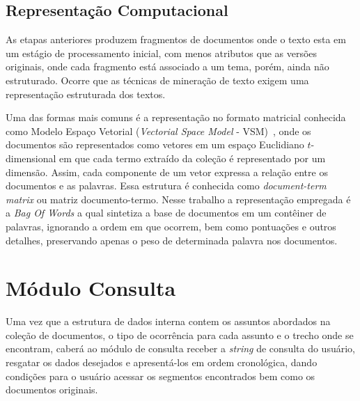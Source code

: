 





\subsection{Representação Computacional}

As etapas anteriores produzem fragmentos de documentos onde o texto esta em um estágio de processamento inicial, com menos atributos que as versões originais, onde cada fragmento está associado a um tema, porém, ainda não estruturado. Ocorre que as técnicas de mineração de texto exigem uma representação estruturada dos textos. %

Uma das formas mais comuns é a representação no formato matricial conhecida como Modelo Espaço Vetorial (\textit{Vectorial Space Model} - VSM)~\cite{Rezende2003}, onde os documentos são representados como vetores em um espaço Euclidiano $t$-dimensional em que cada termo extraído da coleção é representado por um dimensão. Assim, cada componente de um vetor expressa a relação entre os documentos e as palavras. Essa estrutura é conhecida como \textit{document-term matrix} ou matriz documento-termo.  Nesse trabalho a representação empregada é a \textit{Bag Of Words} a qual sintetiza a base de documentos em um contêiner de palavras, ignorando a ordem em que ocorrem, bem como pontuações e outros detalhes, preservando apenas o peso de determinada palavra nos documentos. 







\section{Módulo Consulta}

Uma vez que a estrutura de dados interna contem os assuntos abordados na coleção de documentos, o tipo de ocorrência para cada assunto e o trecho onde se encontram, caberá ao módulo de consulta receber a \textit{string} de consulta do usuário, resgatar os dados desejados e apresentá-los em ordem cronológica, dando condições para o usuário acessar os segmentos encontrados bem como os documentos originais.

